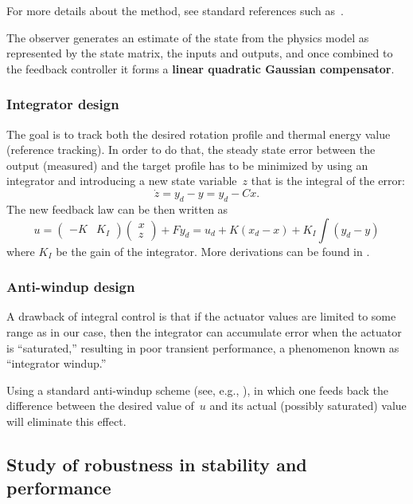 \documentclass[12pt,lot, lof]{puthesis}
\begin{document}
For more details about the method, see standard references such as~\cite{SandP, AandM}.

The observer generates an estimate of the state from the physics model as represented by the state matrix, the inputs and outputs, and once combined to the feedback controller it forms a \textbf{linear quadratic Gaussian compensator}.

\subsubsection{Integrator design} 

The goal is to track both the desired rotation profile and thermal energy value (reference tracking). In order to do that, the steady state error between the output (measured) and the target profile has to be minimized by using an integrator and introducing a new state variable~$z$ that is the integral of the error:
\begin{equation}
	\dot{z} = y_{d} - y = y_{d} - C x.
	\label{integral}
\end{equation}
The new feedback law can be then written as
\begin{equation}
u = \left(\! \begin{array}{cc}  -K & K_I\end{array}\!\right) \left(\! \begin{array}{c}  x \\ z \end{array}\!\right) + F y_{d} 
   = u_d + K (x_d - x) + K_I \!\!\int (y_d - y)
\end{equation}
where $K_I$ be the gain of the integrator. More derivations can be found in \cite{Goumiri15}.

\subsubsection{Anti-windup design}
A drawback of integral control is that if the actuator values are limited to some range as in our case, then the integrator can accumulate error when the actuator is ``saturated,'' resulting in poor transient performance, a phenomenon known as ``integrator windup.'' 

Using a standard anti-windup scheme (see, e.g., \cite{AandM, Lewis}), in which one feeds back the difference between the desired value of~$u$ and its actual (possibly saturated) value will eliminate this effect.  

\subsection{Study of robustness in stability and performance}
\end{document}
